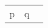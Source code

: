 \documentclass{article}
\begin{document}
\begin{tabular}{|c|c|c|}
p & q 
\end{tabular}
\end{document}
